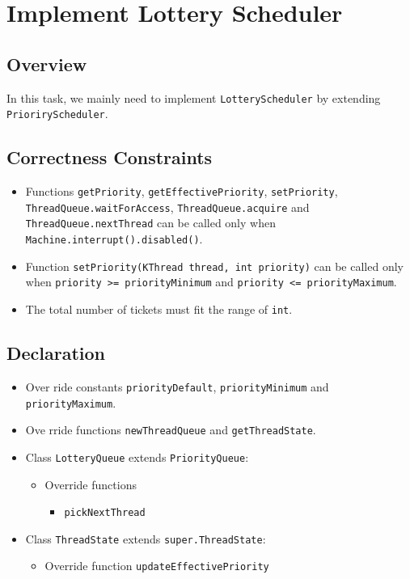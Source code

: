 \documentclass{article}
\begin{document}
\section{Implement Lottery Scheduler}
\subsection{Overview}
In this task, we mainly need to implement \texttt{LotteryScheduler} by extending \texttt{PrioriryScheduler}.
\subsection{Correctness Constraints}
\begin{itemize}
    \item
        Functions \texttt{getPriority}, \texttt{getEffectivePriority}, \texttt{setPriority},
        \texttt{ThreadQueue.waitForAccess}, \texttt{ThreadQueue.acquire} and
        \texttt{ThreadQueue.nextThread} can be called only when \texttt{Machine.interrupt().disabled()}.
    \item
        Function \texttt{setPriority(KThread thread, int priority)} can be called only when
        \texttt{priority >= priorityMinimum} and \texttt{priority <= priorityMaximum}.
    \item
        The total number of tickets must fit the range of \texttt{int}.
\end{itemize}
\subsection{Declaration}
\begin{itemize}
    \item
        Over ride constants \texttt{priorityDefault}, \texttt{priorityMinimum} and \texttt{priorityMaximum}.
    \item
        Ove rride functions \texttt{newThreadQueue} and \texttt{getThreadState}.
    \item
        Class \texttt{LotteryQueue} extends \texttt{PriorityQueue}:
        \begin{itemize}
            \item 
                Override functions
                \begin{itemize}
                    \item \texttt{pickNextThread}
                \end{itemize}
        \end{itemize}
    \item 
        Class \texttt{ThreadState} extends \texttt{super.ThreadState}:
        \begin{itemize}
            \item
                Override function \texttt{updateEffectivePriority}
        \end{itemize}
\end{itemize}
\end{document}
